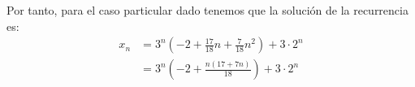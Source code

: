 \documentclass[12pt]{article}
\begin{document}
\begin{ejercicio}[Recurrencia]
        Por tanto, para el caso particular dado tenemos que la solución de la recurrencia es:
        \begin{align*}
            x_n &= 3^n\left(-2 + \frac{17}{18}n + \frac{7}{18}n^2\right) + 3\cdot 2^n \\
            &= 3^n\left(-2 + \frac{n(17 + 7n)}{18}\right) + 3\cdot 2^n
        \end{align*}
        
    
    
    \end{ejercicio}


    
\end{document}
